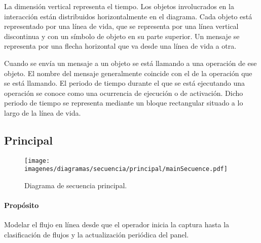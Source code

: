 La dimensión vertical representa el tiempo. Los objetos involucrados en la
interacción están distribuidos horizontalmente en el diagrama. Cada objeto está representado por una línea de vida, que se representa por una línea vertical discontinua y con un símbolo de objeto en su parte superior. Un mensaje se representa por una flecha horizontal que va desde una línea de vida a otra.

Cuando se envía un mensaje a un objeto se está llamando a una operación de
ese objeto. El nombre del mensaje generalmente coincide con el de la operación que se está llamando. El periodo de tiempo durante el que se está ejecutando una operación se conoce como una ocurrencia de ejecución o de activación. Dicho periodo de tiempo se representa mediante un bloque rectangular situado a lo largo de la línea de vida.
\subsection{Principal}

\begin{landscape} \begin{figure}[p] \centering \texttt{[image: imagenes/diagramas/secuencia/principal/mainSecuence.pdf]} \caption{Diagrama de secuencia principal.} \label{fig:seqPrincipal} \end{figure} \end{landscape}

\paragraph{Propósito}
Modelar el flujo en línea desde que el operador inicia la captura hasta la clasificación de flujos y la actualización periódica del panel.

